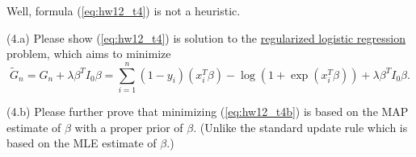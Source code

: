\documentclass{llncs}
\begin{document}
Well, formula (\ref{eq:hw12_t4}) is not a heuristic. 

(4.a) Please show (\ref{eq:hw12_t4}) 
is solution to the \underline{regularized 
logistic regression} problem, which aims to 
minimize 
\begin{equation}
\label{eq:hw12_t4b}
\tilde{G}_{n} = 
G_{n} + \lambda \beta^{T} I_{0} \beta 
= \sum_{i=1}^{n} (1-y_{i}) (x_{i}^{T} \beta) 
- \log (1 + \exp(x_{i}^{T} \beta)) 
+ \lambda \beta^{T} I_{0} \beta.
\end{equation}

(4.b) Please further prove that minimizing 
(\ref{eq:hw12_t4b}) is based on the MAP 
estimate of $\beta$ with a proper prior 
of $\beta$. (Unlike the standard update 
rule which is based on the MLE estimate of $\beta$.) 
\end{document}
